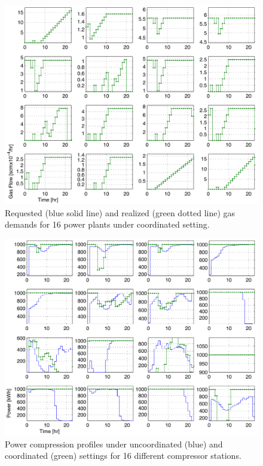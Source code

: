 \documentclass[11pt,twoside]{article}
\begin{document}
\begin{figure}[h!]
\begin{center}
\includegraphics[width=4.5in]{gas_demands_realized_coupled.pdf}\caption{Requested (blue solid line) and realized (green dotted line) gas demands for 16 power plants under coordinated setting.}\label{demands_coupled}
\end{center}
\end{figure}

\begin{figure}[h!]
\begin{center}
\includegraphics[width=4.5in]{power_coupled_decoupled.pdf}\caption{Power compression profiles under uncoordinated (blue) and coordinated (green) settings for 16 different compressor stations.}\label{power}
\end{center}
\end{figure}
\end{document}
